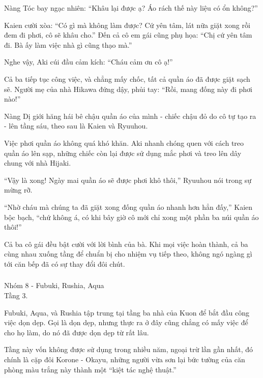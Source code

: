 \documentclass[../main.tex]{subfiles}
\begin{document}
Nàng Tóc bay ngạc nhiên: ``Khâu lại được ạ? Áo rách thế này liệu có ổn không?''

Kaien cười xòa: ``Có gì mà không làm được? Cứ yên tâm, lát nữa giặt xong rồi đem đi phơi, cô sẽ khâu cho.'' Đến cả cô em gái cũng phụ họa: ``Chị cứ yên tâm đi. Bà ấy làm việc nhà gì cũng thạo mà.''

Nghe vậy, Aki cúi đầu cảm kích: ``Cháu cảm ơn cô ạ!''

Cả ba tiếp tục công việc, và chẳng mấy chốc, tất cả quần áo đã được giặt sạch sẽ. Người mẹ của nhà Hikawa đứng dậy, phủi tay: ``Rồi, mang đống này đi phơi nào!''

Nàng Dị giới hăng hái bê chậu quần áo của mình - chiếc chậu đỏ do cô tự tạo ra - lên tầng sáu, theo sau là Kaien và Ryuuhou.

Việc phơi quần áo không quá khó khăn. Aki nhanh chóng quen với cách treo quần áo lên sạp, những chiếc còn lại được sử dụng mắc phơi và treo lên dây chung với nhà Hijaki.

``Vậy là xong! Ngày mai quần áo sẽ được phơi khô thôi,'' Ryuuhou nói trong sự mừng rỡ.

``Nhờ cháu mà chúng ta đã giặt xong đống quần áo nhanh hơn hẳn đấy,'' Kaien bộc bạch, ``chứ không á, có khi bây giờ cô mới chỉ xong một phần ba núi quần áo thôi!''

Cả ba cô gái đều bật cười với lời bình của bà. Khi mọi việc hoàn thành, cả ba cùng nhau xuống tầng để chuẩn bị cho nhiệm vụ tiếp theo, không ngó ngàng gì tới căn bếp đã có sự thay đổi đôi chút.

\vspace{-40pt} \subsubsection*{\label{ep-003.IVh}} 

\begin{center}
    {\color{T8} Nhóm 8 - Fubuki, Rushia, Aqua}\\Tầng 3.
\end{center}

Fubuki, Aqua, và Rushia tập trung tại tầng ba nhà của Kuon để bắt đầu công việc dọn dẹp. Gọi là dọn dẹp, nhưng thực ra ở đây cũng chẳng có mấy việc để cho họ làm, do nó đã được dọn dẹp từ rất lâu.

Tầng này vốn không được sử dụng trong nhiều năm, ngoại trừ lần gần nhất, đó chính là cặp đôi Korone - Okayu, những người vừa sơn lại bức tường của căn phòng màu trắng này thành một ``kiệt tác nghệ thuật.''
\end{document}
